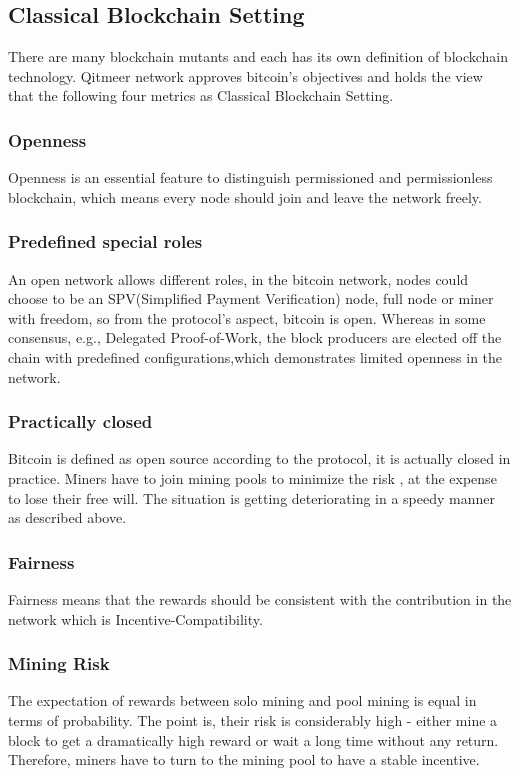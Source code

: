 \documentclass[a4paper,11pt]{article}
\begin{document}
\subsection{Classical Blockchain Setting}
There are many blockchain mutants and each has its own definition of blockchain technology. Qitmeer network approves  bitcoin’s objectives and holds the view that the following four metrics as Classical Blockchain Setting.

\subsubsection{Openness}
Openness is an essential feature to distinguish permissioned and permissionless blockchain, which means every node should join and leave the network freely.


\subsubsection*{Predefined special roles}
An open network allows different roles, in the bitcoin network, nodes could choose to be an SPV(Simplified Payment Verification) node, full node or miner with freedom, so from the protocol’s aspect, bitcoin is open. Whereas in some consensus, e.g., Delegated Proof-of-Work, the block producers are elected off the chain with predefined  configurations,which demonstrates limited openness in the network.

\subsubsection*{Practically closed}
Bitcoin is defined as open source according to the protocol, it is actually closed in practice. Miners have to join mining pools to minimize the risk , at the expense to lose their free will. The situation is getting deteriorating in a speedy manner as described above. 


\subsubsection{Fairness}
Fairness means that the rewards should be consistent with the contribution in the network which is Incentive-Compatibility.

\subsubsection*{Mining Risk}
The expectation of rewards between solo mining and pool mining is equal in terms of probability. The point is, their risk is considerably high - either mine a block to get a dramatically high reward or wait a long time without any return. Therefore, miners have to turn to the mining pool to have a stable incentive.
\end{document}
